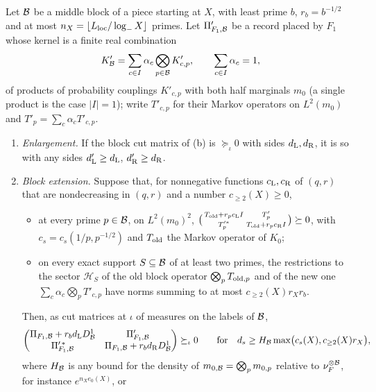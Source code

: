 \begin{lemma}\label{lem:record:asymmetric-gram}
Let $\mathcal B$ be a middle block of a piece starting at $X$, with least prime $b$,
$r_b=b^{-1/2}$ and at most $n_X=\lfloor L_{\rm loc}/\log_-X\rfloor$ primes. Let
$\Pi'_{F_1,\mathcal B}$ be a record placed by $F_1$ whose kernel is a finite real
combination
\[
 K'_\mathcal B=\sum_{c\in I}\alpha_c\bigotimes_{p\in\mathcal B}K'_{c,p},\qquad
 \sum_{c\in I}\alpha_c=1,
\]
of products of probability couplings $K'_{c,p}$ with both half marginals $m_0$
(a single product is the case $|I|=1$); write $T'_{c,p}$ for their Markov
operators on $L^2(m_0)$ and $T'_p=\sum_c\alpha_cT'_{c,p}$.
\begin{enumerate}[label=(\alph*)]
\item \emph{Enlargement.} If the block cut matrix of (b) is $\succeq_\iota0$ with
 sides $d_{\rm L},d_{\rm R}$, it is so with any sides $d'_{\rm L}\ge d_{\rm L}$,
 $d'_{\rm R}\ge d_{\rm R}$.
\item \emph{Block extension.} Suppose that, for nonnegative functions $c_{\rm L},c_{\rm R}$
 of $(q,r)$ that are nondecreasing in $(q,r)$ and a number $c_{\ge2}(X)\ge0$,
 \begin{itemize}
 \item at every prime $p\in\mathcal B$, on $L^2(m_0)^2$,
  $\bigl(\begin{smallmatrix}T_{\rm old}+r_pc_{\rm L}I&T'_p\\
  T'^*_p&T_{\rm old}+r_pc_{\rm R}I\end{smallmatrix}\bigr)\succeq0$, with
  $c_s=c_s(1/p,p^{-1/2})$ and $T_{\rm old}$ the Markov operator of $K_0$;
 \item on every exact support $S\subseteq\mathcal B$ of at least two primes, the
  restrictions to the sector $\mathcal H_S$ of the old block operator
  $\bigotimes_pT_{{\rm old},p}$ and of the new one $\sum_c\alpha_c\bigotimes_pT'_{c,p}$
  have norms summing to at most $c_{\ge2}(X)r_Xr_b$.
 \end{itemize}
 Then, as cut matrices at $\iota$ of measures on the labels of $\mathcal B$,
 \[
  \begin{pmatrix}\Pi_{F_1,\mathcal B}+r_bd_{\rm L}D^1_\mathcal B&\Pi'_{F_1,\mathcal B}\\
  \Pi'^{\,*}_{F_1,\mathcal B}&\Pi_{F_1,\mathcal B}+r_bd_{\rm R}D^1_\mathcal B
  \end{pmatrix}\succeq_\iota0
  \qquad\text{for}\quad
  d_s\ge H_\mathcal B\max\bigl(c_s(X),c_{\ge2}(X)r_X\bigr),
 \]
 where $H_\mathcal B$ is any bound for the density of $m_{0,\mathcal B}=\bigotimes_pm_{0,p}$
 relative to $\nu_F^{\otimes\mathcal B}$, for instance $e^{n_Xe_0(X)}$, or

\end{enumerate}
\end{lemma}
